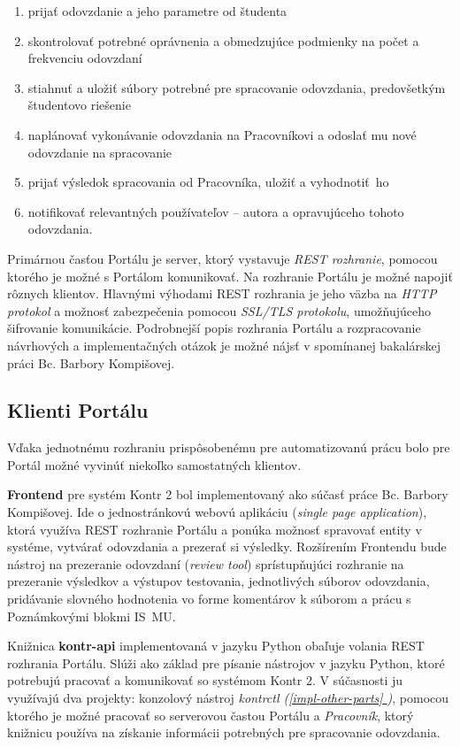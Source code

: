 \documentclass[
  digital, %
  oneside, %
  table,   %
  lof,     %
  lot,   %
]{fithesis3}
\newcommand*{\fullref}[1]{\hyperref[{#1}]{\ref*{#1} \nameref*{#1}}}
\begin{document}
\begin{enumerate}
  \item prijať odovzdanie a jeho parametre od študenta
  \item skontrolovať potrebné oprávnenia a obmedzujúce podmienky na počet a frekvenciu odovzdaní
  \item stiahnuť a uložiť súbory potrebné pre spracovanie odovzdania, predovšetkým študentovo riešenie
  \item naplánovať vykonávanie odovzdania na Pracovníkovi a odoslať mu nové odovzdanie na spracovanie
  \item prijať výsledok spracovania od Pracovníka, uložiť a vyhodnotiť~ho
  \item notifikovať relevantných používateľov -- autora a opravujúceho tohoto odovzdania.
\end{enumerate}

Primárnou časťou Portálu je server, ktorý vystavuje \emph{REST rozhranie}\cite{fielding}, pomocou ktorého je možné s Portálom komunikovať. Na rozhranie Portálu je možné napojiť rôznych klientov. Hlavnými výhodami REST rozhrania je jeho väzba na \emph{HTTP protokol}\cite{RFC2616} a možnosť zabezpečenia pomocou \emph{SSL/TLS protokolu}\cite{RFC8446}, umožňujúceho šifrovanie komunikácie. Podrobnejší popis rozhrania Portálu a rozpracovanie návrhových a implementačných otázok je možné nájsť v spomínanej bakalárskej práci Bc. Barbory Kompišovej\cite{kontr-portal}.

\subsection{Klienti Portálu}
Vďaka jednotnému rozhraniu prispôsobenému pre automatizovanú prácu bolo pre Portál možné vyvinúť niekoľko samostatných klientov. 

\textbf{Frontend} pre systém Kontr 2 bol implementovaný ako súčasť práce Bc. Barbory Kompišovej\cite{kontr-portal}. Ide o jednostránkovú webovú aplikáciu (\emph{single page application}), ktorá využíva REST rozhranie Portálu a ponúka možnosť spravovať entity v systéme, vytvárať odovzdania a prezerať si výsledky. Rozšírením Frontendu bude nástroj na prezeranie odovzdaní (\emph{review tool}) sprístupňujúci rozhranie na prezeranie výsledkov a výstupov testovania, jednotlivých súborov odovzdania, pridávanie slovného hodnotenia vo forme komentárov k súborom a prácu s Poznámkovými blokmi IS~MU. 

Knižnica \textbf{kontr-api} implementovaná v jazyku Python obaľuje volania REST rozhrania Portálu. Slúži ako základ pre písanie nástrojov v jazyku Python, ktoré potrebujú pracovať a komunikovať so systémom Kontr 2. V súčasnosti ju využívajú dva projekty: konzolový nástroj \emph{kontrctl (\fullref{impl-other-parts})}, pomocou ktorého je možné pracovať so serverovou častou Portálu a \emph{Pracovník}, ktorý knižnicu používa na získanie informácii potrebných pre spracovanie odovzdania.
\end{document}
